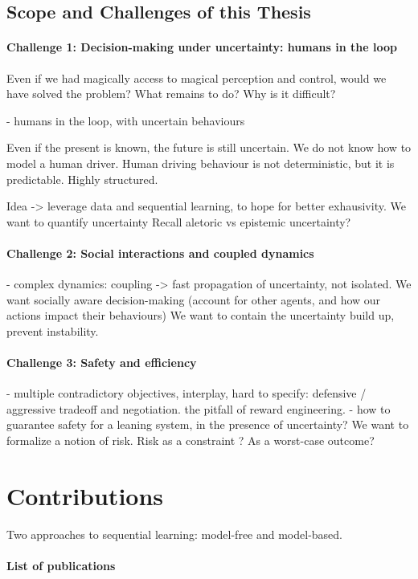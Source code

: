 \subsection{Scope and Challenges of this Thesis}

\paragraph{Challenge 1: Decision-making under uncertainty: humans in the loop}
Even if we had magically access to magical perception and control, would we have solved the problem? What remains to do?
Why is it difficult?

- humans in the loop, with uncertain behaviours

Even if the present is known, the future is still uncertain.
We do not know how to model a human driver.
Human driving behaviour is not deterministic, but it is predictable. Highly structured.

Idea -> leverage data and sequential learning, to hope for better exhausivity.
We want to quantify uncertainty
Recall aletoric vs epistemic uncertainty?

\paragraph{Challenge 2: Social interactions and coupled dynamics}
- complex dynamics: coupling -> fast propagation of uncertainty, not isolated.
We want socially aware decision-making (account for other agents, and how our actions impact their behaviours)
We want to contain the uncertainty build up, prevent instability.

\paragraph{Challenge 3: Safety and efficiency}
- multiple contradictory objectives, interplay, hard to specify: defensive / aggressive tradeoff and negotiation.
the pitfall of reward engineering.
- how to guarantee safety for a leaning system, in the presence of uncertainty?
We want to formalize a notion of risk. Risk as a constraint ? As a worst-case outcome?

\section{Contributions}

Two approaches to sequential learning: model-free and model-based.

\paragraph{List of publications}
